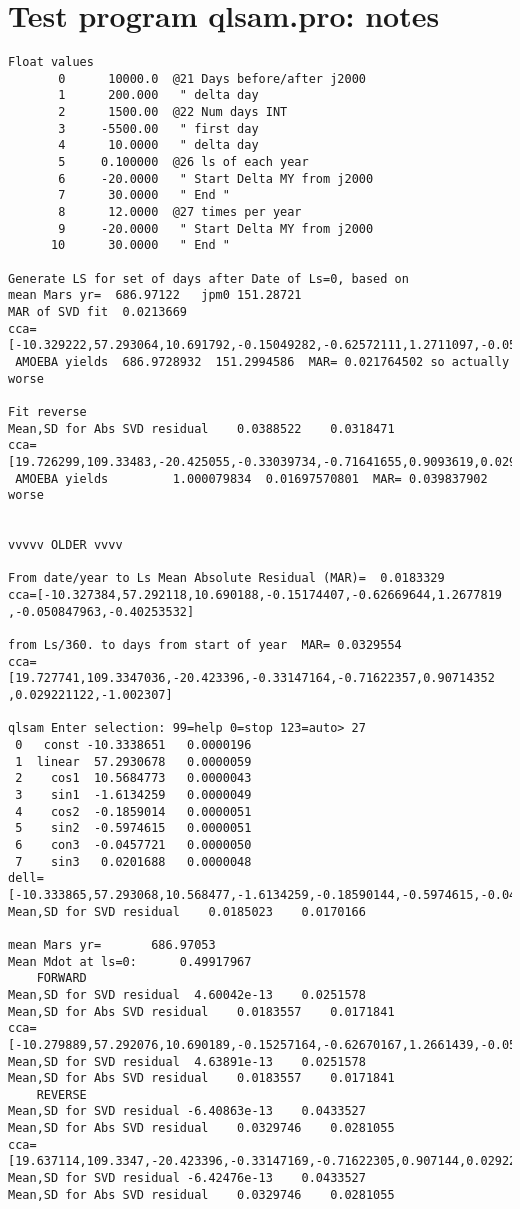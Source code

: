 \documentclass[draft]{article}
\begin{document}
\section{Test program qlsam.pro: notes}
\vspace{-3.mm} 
\begin{verbatim}
Float values
       0      10000.0  @21 Days before/after j2000
       1      200.000   " delta day
       2      1500.00  @22 Num days INT
       3     -5500.00   " first day
       4      10.0000   " delta day
       5     0.100000  @26 ls of each year
       6     -20.0000   " Start Delta MY from j2000
       7      30.0000   " End "
       8      12.0000  @27 times per year
       9     -20.0000   " Start Delta MY from j2000
      10      30.0000   " End "

Generate LS for set of days after Date of Ls=0, based on 
mean Mars yr=  686.97122   jpm0 151.28721
MAR of SVD fit  0.0213669  
cca=[-10.329222,57.293064,10.691792,-0.15049282,-0.62572111,1.2711097,-0.05001682,-0.41212631]
 AMOEBA yields  686.9728932  151.2994586  MAR= 0.021764502 so actually worse

Fit reverse
Mean,SD for Abs SVD residual    0.0388522    0.0318471
cca=[19.726299,109.33483,-20.425055,-0.33039734,-0.71641655,0.9093619,0.029254431,-0.9966046]
 AMOEBA yields         1.000079834  0.01697570801  MAR= 0.039837902 worse


vvvvv OLDER vvvv

From date/year to Ls Mean Absolute Residual (MAR)=  0.0183329
cca=[-10.327384,57.292118,10.690188,-0.15174407,-0.62669644,1.2677819
,-0.050847963,-0.40253532]

from Ls/360. to days from start of year  MAR= 0.0329554
cca=[19.727741,109.3347036,-20.423396,-0.33147164,-0.71622357,0.90714352 
,0.029221122,-1.002307]

qlsam Enter selection: 99=help 0=stop 123=auto> 27
 0   const -10.3338651   0.0000196
 1  linear  57.2930678   0.0000059
 2    cos1  10.5684773   0.0000043
 3    sin1  -1.6134259   0.0000049
 4    cos2  -0.1859014   0.0000051
 5    sin2  -0.5974615   0.0000051
 6    con3  -0.0457721   0.0000050
 7    sin3   0.0201688   0.0000048
dell=[-10.333865,57.293068,10.568477,-1.6134259,-0.18590144,-0.5974615,-0.045772095,0.020168757]
Mean,SD for SVD residual    0.0185023    0.0170166

mean Mars yr=       686.97053
Mean Mdot at ls=0:      0.49917967
    FORWARD
Mean,SD for SVD residual  4.60042e-13    0.0251578
Mean,SD for Abs SVD residual    0.0183557    0.0171841
cca=[-10.279889,57.292076,10.690189,-0.15257164,-0.62670167,1.2661439,-0.050841373,-0.40489779]
Mean,SD for SVD residual  4.63891e-13    0.0251578
Mean,SD for Abs SVD residual    0.0183557    0.0171841
    REVERSE
Mean,SD for SVD residual -6.40863e-13    0.0433527
Mean,SD for Abs SVD residual    0.0329746    0.0281055
cca=[19.637114,109.3347,-20.423396,-0.33147169,-0.71622305,0.907144,0.029221461,-1.0022922]
Mean,SD for SVD residual -6.42476e-13    0.0433527
Mean,SD for Abs SVD residual    0.0329746    0.0281055


\end{verbatim}
\end{document}
